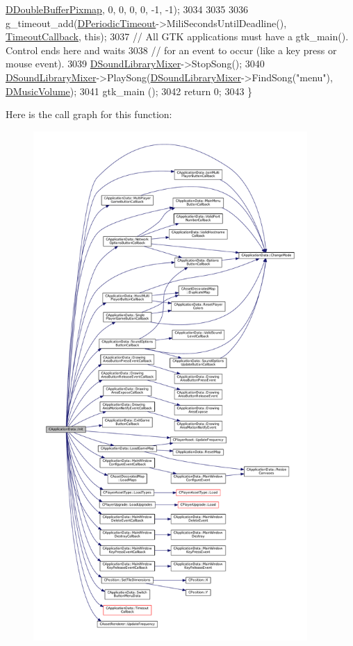 \begin{DoxyCode}
      \hyperlink{classCApplicationData_aefb64ec5ca3f791f6d431cfc56b9f3b3}{DDoubleBufferPixmap}, 0, 0, 0, 0, -1, -1);
3034     
3035     
3036     g\_timeout\_add(\hyperlink{classCApplicationData_a0265cb7aba9f099faed2a1c8ee588d33}{DPeriodicTimeout}->MiliSecondsUntilDeadline(), 
      \hyperlink{classCApplicationData_af66e15f6935f053b46a11aaa51a869c9}{TimeoutCallback}, \textcolor{keyword}{this});
3037     \textcolor{comment}{// All GTK applications must have a gtk\_main(). Control ends here and waits }
3038     \textcolor{comment}{// for an event to occur (like a key press or mouse event). }
3039     \hyperlink{classCApplicationData_aa1e6876121bb4fb229ec6b930a8a6766}{DSoundLibraryMixer}->StopSong();
3040     \hyperlink{classCApplicationData_aa1e6876121bb4fb229ec6b930a8a6766}{DSoundLibraryMixer}->PlaySong(\hyperlink{classCApplicationData_aa1e6876121bb4fb229ec6b930a8a6766}{DSoundLibraryMixer}->FindSong(\textcolor{stringliteral}{"menu"}), 
      \hyperlink{classCApplicationData_a8bc61af4a83a667102e55cca2a739c3b}{DMusicVolume});
3041     gtk\_main ();
3042     \textcolor{keywordflow}{return} 0;
3043 \}
\end{DoxyCode}
Here is the call graph for this function\+:\nopagebreak
\begin{figure}[H]
\begin{center}
\leavevmode
\includegraphics[height=550pt]{classCApplicationData_ab757e7ad037decb18cefa3f4ad2e1298_cgraph}
\end{center}
\end{figure}
